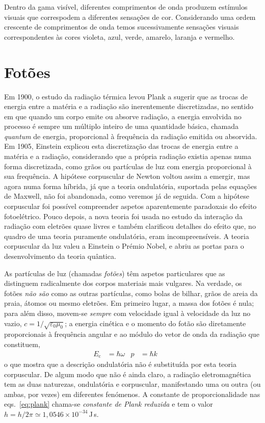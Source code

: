 Dentro da gama visível, diferentes comprimentos de onda produzem estímulos
visuais que correspodem a diferentes sensações de cor. Considerando uma ordem
crescente de comprimentos de onda temos sucessivamente sensações visuais
correspondentes às cores violeta, azul, verde, amarelo, laranja e vermelho.



\section{Fotões}
Em 1900, o estudo da radiação térmica levou Plank a sugerir que as trocas de
energia entre a matéria e a radiação são inerentemente discretizadas, no sentido
em que quando um corpo emite ou absorve radiação, a energia envolvida no
processo é sempre um múltiplo inteiro de uma quantidade básica, chamada
\emph{quantum} de energia, proporcional à frequência da radiação emitida ou
absorvida. Em 1905, Einstein explicou esta discretização das trocas de energia
entre a matéria e a radiação, considerando que a própria radiação existia
apenas numa forma discretizada, como grãos ou partículas de luz com energia
proporcional à sua frequência. A hipótese corpuscular de Newton voltou assim a
emergir, mas agora numa forma híbrida, já que a teoria ondulatória, suportada
pelas equações de Maxwell, não foi abandonada, como veremos já de seguida. Com a
hipótese corpuscular foi possível compreender aspetos aparentemente paradoxais
do efeito fotoelétrico. Pouco depois, a nova teoria foi usada no estudo da
interação da radiação com eletrões quase livres e também clarificou detalhes
do efeito que, no quadro de uma teoria puramente ondulatória, eram
incompreensíveis. A teoria corpuscular da luz valeu a Einstein o Prémio Nobel, e
abriu as portas para o desenvolvimento da teoria quântica.


As partículas de luz (chamadas \emph{fotões}) têm aspetos particulares que as
distinguem radicalmente dos corpos materiais mais vulgares.  Na verdade, os
fotões \emph{não são} como as outras partículas, como bolas de bilhar, grãos de
areia da praia, átomos ou mesmo eletrões. Em primeiro lugar, a massa dos fotões
é nula; para além disso, movem-se \emph{sempre} com velocidade igual à
velocidade da luz no vazio, $c=1/\sqrt{\varepsilon_0\mu_0}$; a energia cinética
e o momento do fotão são diretamente proporcionais à frequência angular e ao
módulo do vetor de onda da radiação que constituem,
\begin{align}\label{eq:plank}
    E_\text{c}&=\hbar\omega&p&=\hbar k\qquad
\end{align}
o que mostra que a descrição ondulatória não é substituída por esta teoria
corpuscular. De algum modo que não é ainda claro, a radiação eletromagnética
tem as duas naturezas, ondulatória e corpuscular, manifestando uma ou outra (ou
ambas, por vezes) em diferentes fenómenos.
A constante de proporcionalidade nas eqs.~\eqref{eq:plank} chama-se
\emph{constante de Plank reduzida} e tem o valor
$h=h/2\pi\simeq1,0546\times10^{-34}$\,J\,s. 

